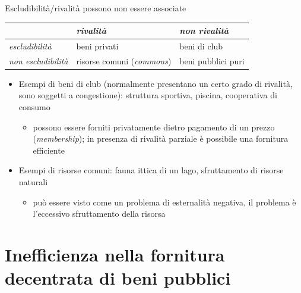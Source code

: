 \documentclass[aspectratio=149,11pt]{beamer}
\begin{document}
\begin{frame}{Escludibilità/rivalità possono non essere associate}
\begin{center}
\begin{tabular}{lll}
\toprule
 & \emph{rivalità} & \emph{non rivalità}\\[0pt]
\midrule
\emph{escludibilità} & beni privati & beni di club\\[0pt]
\emph{non escludibilità} & risorse comuni (\emph{commons}) & beni pubblici puri\\[0pt]
\bottomrule
\end{tabular}
\end{center}

\begin{itemize}
\item Esempi di beni di club (normalmente presentano un certo grado di rivalità, sono soggetti a congestione): struttura sportiva, piscina, cooperativa di consumo
\begin{itemize}
\item possono essere forniti privatamente dietro pagamento di un prezzo (\emph{membership}); in presenza di rivalità parziale è possibile una fornitura efficiente
\end{itemize}
\item Esempi di risorse comuni: fauna ittica di un lago, sfruttamento di risorse naturali
\begin{itemize}
\item può essere visto come un problema di esternalità negativa, il problema è l'eccessivo sfruttamento della risorsa
\end{itemize}
\end{itemize}
\end{frame}

\section{Inefficienza nella fornitura decentrata di beni pubblici}
\end{document}

